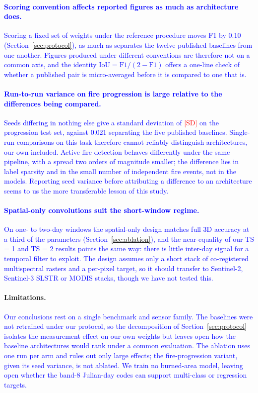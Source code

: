 \documentclass[sensors,article,submit,moreauthors,pdftex]{Definitions/mdpi}
\newcommand{\rev}[1]{\textcolor{blue}{#1}}
\newcommand{\fpSD}{\textcolor{red}{[SD]}}
\begin{document}
\paragraph*{\rev{Scoring convention affects reported figures as much as
architecture does.}} \rev{Scoring a fixed set of weights under the reference
procedure moves F1 by 0.10 (Section~\ref{sec:protocol}), as much as separates
the twelve published baselines from one another. Figures produced under
different conventions are therefore not on a common axis, and the identity
$\mathrm{IoU}=\mathrm{F1}/(2-\mathrm{F1})$ offers a one-line check of whether a
published pair is micro-averaged before it is compared to one that is.}

\paragraph*{\rev{Run-to-run variance on fire progression is large relative to the
differences being compared.}} \rev{Seeds differing in nothing else give a
standard deviation of \fpSD{} on the progression test set, against 0.021
separating the five published baselines. Single-run comparisons on this task
therefore cannot reliably distinguish architectures, our own included. Active
fire detection behaves differently under the same pipeline, with a spread two
orders of magnitude smaller; the difference lies in label sparsity and in the
small number of independent fire events, not in the models. Reporting seed
variance before attributing a difference to an architecture seems to us the more
transferable lesson of this study.}

\paragraph*{\rev{Spatial-only convolutions suit the short-window regime.}}
\rev{On one- to two-day windows the spatial-only design matches full 3D accuracy
at a third of the parameters (Section~\ref{sec:ablation}), and the near-equality
of our TS = 1 and TS = 2 results points the same way: there is little inter-day
signal for a temporal filter to exploit. The design assumes only a short stack of
co-registered multispectral rasters and a per-pixel target, so it should transfer
to Sentinel-2, Sentinel-3 SLSTR or MODIS stacks, though we have not tested this.}

\paragraph*{Limitations.} \rev{Our conclusions rest on a single benchmark and
sensor family. The baselines were not retrained under our protocol, so the
decomposition of Section~\ref{sec:protocol} isolates the measurement effect on
our own weights but leaves open how the baseline architectures would rank under a
common evaluation. The ablation uses one run per arm and rules out only large
effects; the fire-progression variant, given its seed variance, is not ablated.
We train no burned-area model, leaving open whether the band-8 Julian-day codes
can support multi-class or regression targets.}
\end{document}
